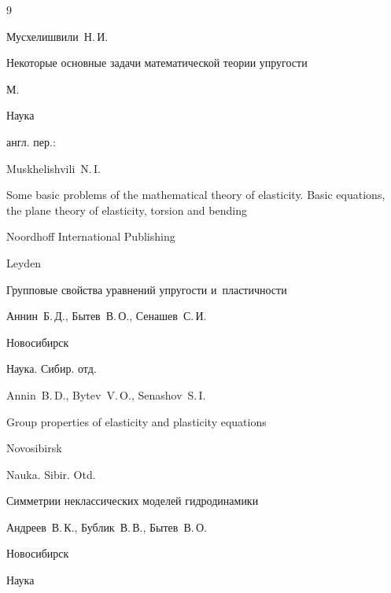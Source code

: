 \begin{thebibliography}{9}




\by Мусхелишвили~Н.\,И.

\book Некоторые основные задачи математической теории упругости

\publaddr М. 

\publ Наука



\transl англ. пер.:~

\by Muskhelishvili~N.\,I.

\book Some basic problems of the mathematical theory of elasticity. Basic equations, the plane theory of elasticity, torsion and bending

\publ Noordhoff International Publishing 

\publaddr Leyden






\book Групповые свойства уравнений упругости и~пластичности

\by Аннин~Б.\,Д., Бытев~В.\,О., Сенашев~С.\,И.

\publaddr Новосибирск

\publ Наука. Сибир. отд.



\misctransl

\by Annin~B.\,D., Bytev~V.\,O., Senashov~S.\,I.

\book Group properties of elasticity and plasticity equations

\publaddr Novosibirsk

\publ Nauka. Sibir. Otd.






\book Симметрии неклассических моделей гидродинамики 

\by Андреев~В.\,К., Бублик~В.\,В., Бытев~В.\,О.

\publaddr Новосибирск

\publ Наука



\end{thebibliography}
